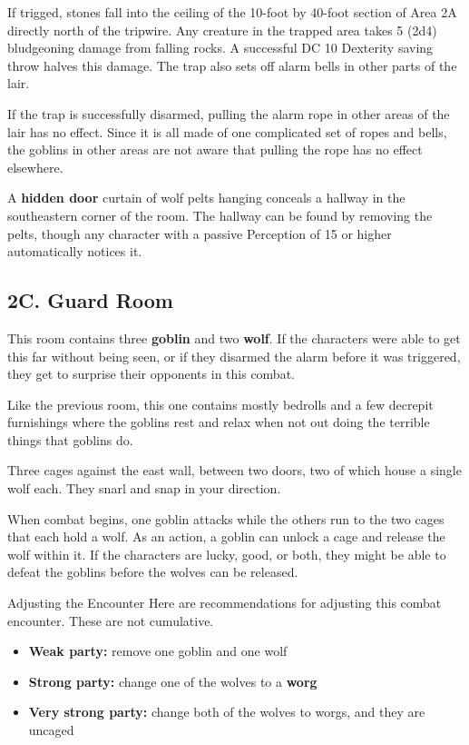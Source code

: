 \documentclass[10pt,a4paper,twoside,bg=print,twocolumn,openany,nodeprecatedcode]{dndbook}
\begin{document}
If trigged, stones fall into the ceiling of the 10-foot by 40-foot section of Area 2A directly north of the tripwire. Any creature in the trapped area takes 5 (2d4) bludgeoning damage from falling rocks. A successful DC 10 Dexterity saving throw halves this damage. The trap also sets off alarm bells in other parts of the lair.

If the trap is successfully disarmed, pulling the alarm rope in other areas of the lair has no effect. Since it is all made of one complicated set of ropes and bells, the goblins in other areas are not aware that pulling the rope has no effect elsewhere.

A \textbf{hidden door} curtain of wolf pelts hanging conceals a hallway in the southeastern corner of the room. The hallway can be found by removing the pelts, though any character with a passive Perception of 15 or higher automatically notices it.

\subsection{2C. Guard Room}
This room contains three \textbf{goblin} and two \textbf{wolf}. If the characters were able to get this far without being seen, or if they disarmed the alarm before it was triggered, they get to surprise their opponents in this combat.

\begin{DndReadAloud}{}
Like the previous room, this one contains mostly bedrolls and a few decrepit furnishings where the goblins rest and relax when not out doing the terrible things that goblins do.

Three cages against the east wall, between two doors, two of which house a single wolf each. They snarl and snap in your direction.

\end{DndReadAloud}

When combat begins, one goblin attacks while the others run to the two cages that each hold a wolf. As an action, a goblin can unlock a cage and release the wolf within it. If the characters are lucky, good, or both, they might be able to defeat the goblins before the wolves can be released.

\begin{DndSidebar}[float=!b]{Adjusting the Encounter}
Here are recommendations for adjusting this combat encounter. These are not cumulative.




\begin{itemize}
\item \textbf{Weak party:} remove one goblin and one wolf
\item \textbf{Strong party:} change one of the wolves to a \textbf{worg}
\item \textbf{Very strong party:} change both of the wolves to worgs, and they are uncaged
\end{itemize}



\end{DndSidebar}
\end{document}
